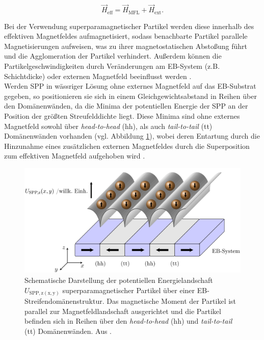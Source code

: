 \documentclass[page,pdftex,12pt,a4paper,twoside,openright]{scrbook}
\begin{document}
\begin{equation}
\vec{H}_\mathrm{eff} = \vec{H}_\mathrm{MFL} + \vec{H}_\mathrm{ext}.
\end{equation}

Bei der Verwendung superparamagnetischer Partikel werden diese innerhalb des effektiven Magnetfeldes aufmagnetisiert, sodass benachbarte Partikel parallele Magnetisierungen aufweisen, was zu ihrer magnetostatischen Abstoßung führt und die Agglomeration der Partikel verhindert. Außerdem können die Partikelgeschwindigkeiten durch Veränderungen am EB-System (z.B. Schichtdicke) oder externen Magnetfeld beeinflusst werden \cite{holzinger_directed_2015}.\\

Werden SPP in wässriger Lösung ohne externes Magnetfeld auf das EB-Substrat gegeben, so positionieren sie sich in einem Gleichgewichtsabstand in Reihen über den Domänenwänden, da die Minima der potentiellen Energie der SPP an der Position der größten Streufelddichte liegt. Diese Minima sind ohne externes Magnetfeld sowohl über \emph{head-to-head} (hh), als auch \emph{tail-to-tail} (tt) Domänenwänden vorhanden (vgl. Abbildung \ref{fig-mfl}), wobei deren Entartung durch die Hinzunahme eines zusätzlichen externen Magnetfeldes durch die Superposition zum effektiven Magnetfeld aufgehoben wird \cite{holzinger_directed_2015}.\\

\begin{figure}[h]
\centering
\includegraphics[width=.5\textwidth]{img/mfl.png}
\caption{\label{fig-mfl}
Schematische Darstellung der potentiellen Energielandschaft \(U_\mathrm{SPP,z(x,y)}\) superparamagnetischer Partikel über einer EB-Streifendomänenstruktur. Das magnetische Moment der Partikel ist parallel zur Magnetfeldlandschaft ausgerichtet und die Partikel befinden sich in Reihen über den \emph{head-to-head} (hh) und \emph{tail-to-tail} (tt) Domänenwänden. Aus \cite{holzinger_transport_2015}.}
\end{figure}
\end{document}
